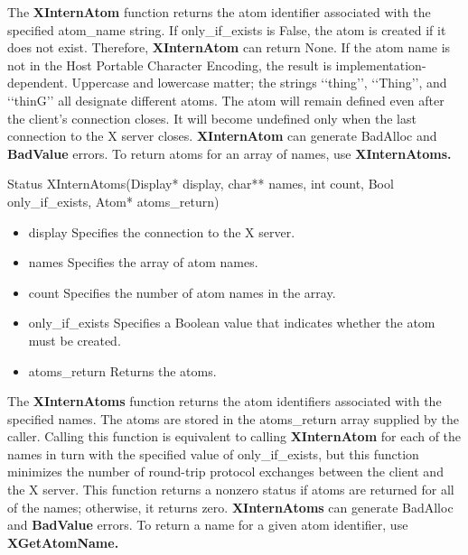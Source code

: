 \documentclass{report}
\begin{document}
\begin{itemize}
\begin{itemize}
        \end{itemize}
        The \textbf{XInternAtom} function returns the atom identifier associated with the specified atom\_name string. If only\_if\_exists is False, the atom is created if it does not exist. Therefore, \textbf{XInternAtom} can return None. If the atom name is not in the Host Portable Character Encoding, the result is implementation-dependent. Uppercase and lowercase matter; the strings ‘‘thing’’, ‘‘Thing’’, and ‘‘thinG’’ all designate different atoms. The atom will remain defined even after the client’s connection closes. It will become undefined only when the last connection to the X server closes.
        \bigbreak \noindent 
        \textbf{XInternAtom} can generate BadAlloc and \textbf{BadValue} errors.
        \bigbreak \noindent 
        To return atoms for an array of names, use \textbf{XInternAtoms.}
        \bigbreak \noindent 
        \begin{cppcode}
            Status XInternAtoms(Display* display, char** names, int count, Bool only_if_exists, Atom* atoms_return)
        \end{cppcode}
        \bigbreak \noindent
        \begin{itemize}
            \item display Specifies the connection to the X server.
            \item names Specifies the array of atom names.
            \item count Specifies the number of atom names in the array.
            \item only\_if\_exists Specifies a Boolean value that indicates whether the atom must be created.
            \item atoms\_return Returns the atoms.
        \end{itemize}
        The \textbf{XInternAtoms} function returns the atom identifiers associated with the specified names. The atoms are stored in the atoms\_return array supplied by the caller. Calling this function is equivalent to calling \textbf{XInternAtom} for each of the names in turn with the specified value of only\_if\_exists, but this function minimizes the number of round-trip protocol exchanges between the client and the X server. This function returns a nonzero status if atoms are returned for all of the names; otherwise, it returns zero.
        \bigbreak \noindent 
        \textbf{XInternAtoms} can generate BadAlloc and \textbf{BadValue} errors.
        \bigbreak \noindent 
        To return a name for a given atom identifier, use \textbf{XGetAtomName.}

\end{itemize}
\end{document}
